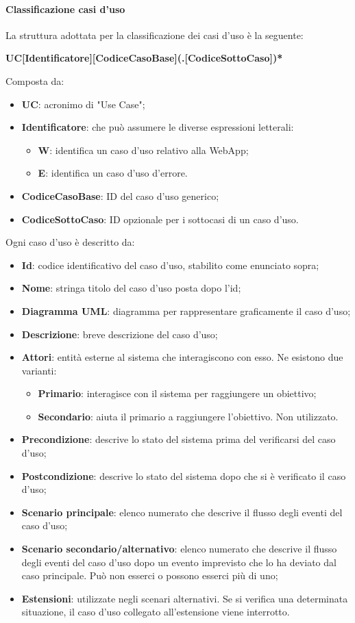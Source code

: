 \paragraph{Classificazione casi d'uso}
La struttura adottata per la classificazione dei casi d'uso è la seguente: \\
\centerline{\textbf{UC[Identificatore][CodiceCasoBase](.[CodiceSottoCaso])*}}
Composta da:
\begin{itemize}
\item \textbf{UC}: acronimo di "Use Case";
\item \textbf{Identificatore}: che può assumere le diverse espressioni letterali:
	\begin{itemize}
		\item \textbf{W}: identifica un caso d'uso relativo alla WebApp;
		\item \textbf{E}: identifica un caso d'uso d'errore.
	\end{itemize}
\item \textbf{CodiceCasoBase}: ID del caso d'uso generico;
\item \textbf{CodiceSottoCaso}: ID opzionale per i sottocasi di un caso d'uso.
\end{itemize}

Ogni caso d'uso è descritto da: 
\begin{itemize}
    \item \textbf{Id}: codice identificativo del caso d'uso, stabilito come enunciato sopra;
    \item \textbf{Nome}: stringa titolo del caso d'uso posta dopo l'id;
    \item \textbf{Diagramma UML}: diagramma per rappresentare graficamente il caso d'uso;
    \item \textbf{Descrizione}: breve descrizione del caso d'uso;
    \item \textbf{Attori}: entità esterne al sistema che interagiscono con esso. Ne esistono due varianti: 
    \begin{itemize}
    \item \textbf{Primario}: interagisce con il sistema per raggiungere un obiettivo;
    \item \textbf{Secondario}: aiuta il primario a raggiungere l'obiettivo. Non utilizzato.
    \end{itemize}
    \item \textbf{Precondizione}: descrive lo stato del sistema prima del verificarsi del caso d'uso;
    \item \textbf{Postcondizione}: descrive lo stato del sistema dopo che si è verificato il caso d'uso;
    \item \textbf{Scenario principale}: elenco numerato che descrive il flusso degli eventi del caso d'uso;
    \item \textbf{Scenario secondario/alternativo}: elenco numerato che descrive il flusso degli eventi del caso d'uso dopo un evento imprevisto che lo ha deviato dal caso principale. Può non esserci o possono esserci più di uno;
    \item \textbf{Estensioni}: utilizzate negli scenari alternativi. Se si verifica una determinata situazione, il caso d'uso collegato all'estensione viene interrotto.
\end{itemize}

